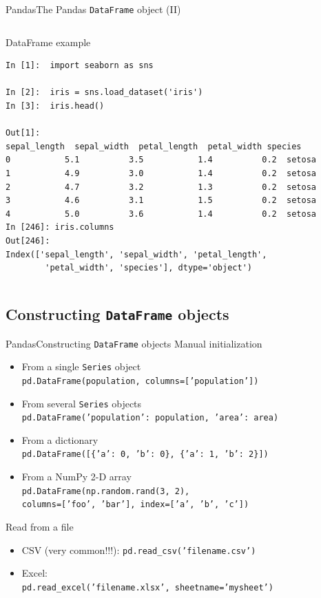 \documentclass[10pt,compress]{beamer} %
\begin{document}
\begin{frame}[fragile]{Pandas}{The Pandas \texttt{DataFrame} object (II)}
	\begin{columns}
 	   \column{\textwidth}
		\begin{exampleblock}{\footnotesize{DataFrame example}}
		\vspace{-0.2cm} 
			\begin{lstlisting}
In [1]:  import seaborn as sns

In [2]:  iris = sns.load_dataset('iris')
In [3]:  iris.head()

Out[1]:
sepal_length  sepal_width  petal_length  petal_width species
0           5.1          3.5           1.4          0.2  setosa
1           4.9          3.0           1.4          0.2  setosa
2           4.7          3.2           1.3          0.2  setosa
3           4.6          3.1           1.5          0.2  setosa
4           5.0          3.6           1.4          0.2  setosa
In [246]: iris.columns
Out[246]: 
Index(['sepal_length', 'sepal_width', 'petal_length', 
        'petal_width', 'species'], dtype='object')
		\end{lstlisting}
		\vspace{-0.2cm} 
		\end{exampleblock}
	\end{columns}
\end{frame}

\subsection{Constructing \texttt{DataFrame} objects}
\begin{frame}[fragile]{Pandas}{Constructing \texttt{DataFrame} objects}
	Manual initialization
	\begin{itemize}
		\item From a single \texttt{Series} object\\
		\texttt{pd.DataFrame(population, columns=['population'])}
		\item From several \texttt{Series} objects\\
		\texttt{pd.DataFrame({'population': population,
		                       'area': area})}
		\item From a dictionary\\
	    \texttt{pd.DataFrame([\{'a': 0, 'b': 0\}, \{'a': 1, 'b': 2\}])}
		\item From a NumPy 2-D array\\
		\texttt{pd.DataFrame(np.random.rand(3, 2), \\columns=['foo', 'bar'], index=['a', 'b', 'c'])}
	\end{itemize}
	Read from a file
	\begin{itemize}
		\item CSV (very common!!!): \texttt{pd.read\_csv('filename.csv')}
		\item Excel:\\
		\texttt{pd.read\_excel('filename.xlsx', sheetname='mysheet')}
	\end{itemize}
\end{frame}
\end{document}
